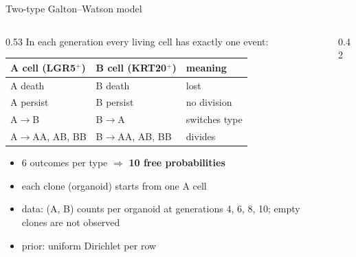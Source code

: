 \documentclass[aspectratio=169,11pt]{beamer}
\begin{document}
\begin{frame}{Two-type Galton--Watson model}
\begin{columns}[c]
\begin{column}{0.53\textwidth}
In each generation every living cell has exactly one event:
\medskip

{\small\begin{tabular}{@{}lll@{}}\toprule
A cell (LGR5$^+$) & B cell (KRT20$^+$) & meaning \\\midrule
A death & B death & lost \\
A persist & B persist & no division \\
A$\to$B & \alert{B$\to$A} & switches type \\
A$\to$AA, AB, BB & B$\to$AA, AB, BB & divides \\\bottomrule
\end{tabular}}

\medskip
\begin{itemize}\small
\item 6 outcomes per type $\Rightarrow$ \textbf{10 free probabilities}
\item each clone (organoid) starts from one A cell
\item data: (A, B) counts per organoid at generations 4, 6, 8, 10; empty clones are not observed
\item prior: uniform Dirichlet per row
\end{itemize}
\end{column}
\begin{column}{0.42\textwidth}
\centering
{}

\medskip
\end{column}
\end{columns}
\end{frame}
\end{document}
